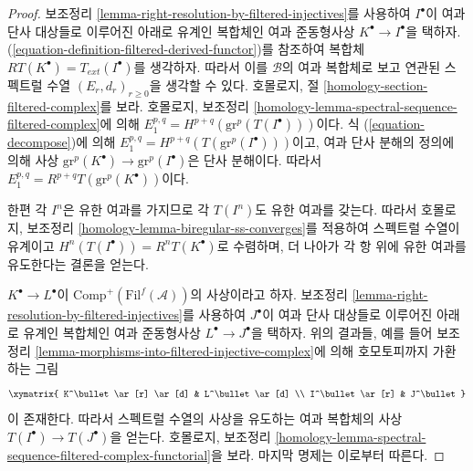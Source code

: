 \begin{proof}
보조정리 \ref{lemma-right-resolution-by-filtered-injectives}를 사용하여
$I^\bullet$이 여과 단사 대상들로 이루어진 아래로 유계인 복합체인
여과 준동형사상 $K^\bullet \to I^\bullet$을 택하자.
(\ref{equation-definition-filtered-derived-functor})를 참조하여 복합체
$RT(K^\bullet) = T_{ext}(I^\bullet)$를 생각하자. 따라서 이를
$\mathcal{B}$의 여과 복합체로 보고 연관된 스펙트럴 수열
$(E_r, d_r)_{r \geq 0}$을 생각할 수 있다. 호몰로지, 절
\ref{homology-section-filtered-complex}를 보라. 호몰로지, 보조정리
\ref{homology-lemma-spectral-sequence-filtered-complex}에 의해
$E_1^{p, q} = H^{p + q}(\text{gr}^p(T(I^\bullet)))$이다.
식 (\ref{equation-decompose})에 의해
$E_1^{p, q} = H^{p + q}(T(\text{gr}^p(I^\bullet)))$이고, 여과 단사
분해의 정의에 의해 사상
$\text{gr}^p(K^\bullet) \to \text{gr}^p(I^\bullet)$은 단사 분해이다.
따라서 $E_1^{p, q} = R^{p + q}T(\text{gr}^p(K^\bullet))$이다.

\medskip\noindent
한편 각 $I^n$은 유한 여과를 가지므로 각 $T(I^n)$도 유한 여과를
갖는다. 따라서 호몰로지, 보조정리
\ref{homology-lemma-biregular-ss-converges}를 적용하여 스펙트럴 수열이
유계이고 $H^n(T(I^\bullet)) = R^nT(K^\bullet)$로 수렴하며, 더 나아가
각 항 위에 유한 여과를 유도한다는 결론을 얻는다.

\medskip\noindent
$K^\bullet \to L^\bullet$이
$\text{Comp}^{+}(\text{Fil}^f(\mathcal{A}))$의 사상이라고 하자.
보조정리 \ref{lemma-right-resolution-by-filtered-injectives}를 사용하여
$J^\bullet$이 여과 단사 대상들로 이루어진 아래로 유계인 복합체인
여과 준동형사상 $L^\bullet \to J^\bullet$을 택하자. 위의 결과들,
예를 들어 보조정리
\ref{lemma-morphisms-into-filtered-injective-complex}에 의해 호모토피까지
가환하는 그림
$$
\xymatrix{
K^\bullet \ar[r] \ar[d] & L^\bullet \ar[d] \\
I^\bullet \ar[r] & J^\bullet
}
$$
이 존재한다. 따라서 스펙트럴 수열의 사상을 유도하는 여과 복합체의
사상 $T(I^\bullet) \to T(J^\bullet)$을 얻는다. 호몰로지, 보조정리
\ref{homology-lemma-spectral-sequence-filtered-complex-functorial}을 보라.
마지막 명제는 이로부터 따른다.
\end{proof}

